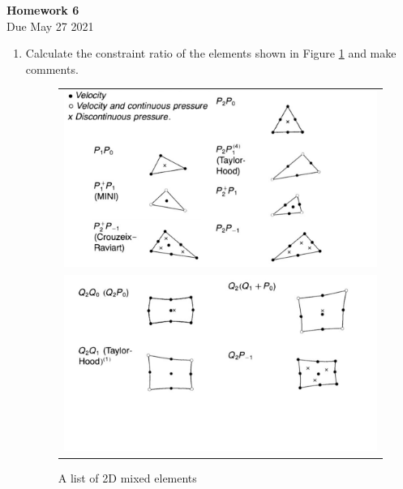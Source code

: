 \documentclass[12pt]{article}
\begin{document}
\begin{center}
\textbf{\Large
Homework 6
}\\
\normalsize Due May 27 2021





\end{center}
\begin{enumerate}
\item Calculate the constraint ratio of the elements shown in Figure \ref{fig:elem} and make comments.


\begin{figure}[h]
	\begin{center}
	\begin{tabular}{c}
\includegraphics[angle=0, trim=0 0 0 0, clip=true, scale = 0.35]{./element1.pdf}\\
\includegraphics[angle=0, trim=0 150 0 0, clip=true, scale = 0.35]{./element2.pdf}
\end{tabular}
\end{center} 
\caption{A list of 2D mixed elements}
\label{fig:elem}
\end{figure}



\end{enumerate}
\end{document}

